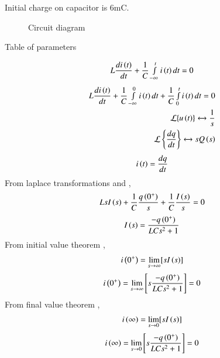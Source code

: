 \documentclass[beamer]{IEEEtran}
\theoremstyle{remark}
\begin{document}
     Initial charge on capacitor is 6mC.
     \begin{figure}[h]


  
    

    



  
  
       
  
    \caption{Circuit diagram}
     
   \label{fig:12.7.8.1}
\end{figure}
\begin{table}[h]
  \centering
  
  \caption{Table of parameters}
  \label{tab:12.7.8.1}
\end{table}
\begin{align}
    L\frac{di\left(t\right)}{dt}+\frac{1}{C}\smallint_{-\infty}^{t}i\left(t\right)dt=0
\end{align}
\begin{align}
      L\frac{di\left(t\right)}{dt}+\frac{1}{C}\smallint_{-\infty}^{0}i\left(t\right)dt+\frac{1}{C}\smallint_{0}^{t}i\left(t\right)dt=0\\
\mathcal{L}\{u\left(t\right)\} \xleftrightarrow{} \frac{1}{s}\\
\mathcal{L} \left\{\frac{dq}{dt}\right\}\xleftrightarrow{} sQ\left(s\right)
\end{align}
\begin{align}
 i\left(t\right)=\frac{dq}{dt}
\end{align}
From laplace transformations  and ,
\begin{align}
    L{sI\left(s\right)}+\frac{1}{C}\frac{q\left(0^{+}\right)}{s}+\frac{1}{C}\frac{I\left(s\right)}{s}=0
\end{align}
\begin{align}
    I\left(s\right)= \frac{-q\left(0^{+}\right)}{LCs^2+1}
\end{align}
From initial value theorem ,
\begin{align}
    i\left(0^{+}\right)=\lim_{s\to\infty}[sI\left(s\right)]
\end{align}
\begin{align}
    i\left(0^{+}\right)=\lim_{s\to\infty}\left[s\frac{-q\left(0^{+}\right)}{LCs^2+1}\right]=0
\end{align}
From final value theorem ,
\begin{align}
     i\left(\infty\right)=\lim_{s\to0}[sI\left(s\right)]
\end{align}
\begin{align}
   i\left(\infty\right)=\lim_{s\to0}\left[s\frac{-q\left(0^{+}\right)}{LCs^2+1}\right]=0 
\end{align}
\end{document}
